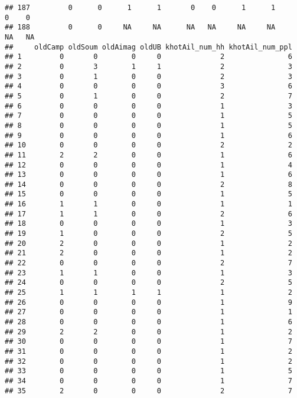 \documentclass[
]{article}
\begin{document}
\begin{verbatim}
## 187         0      0      1      1       0    0      1      1       0    0
## 188         0      0     NA     NA      NA   NA     NA     NA      NA   NA
##     oldCamp oldSoum oldAimag oldUB khotAil_num_hh khotAil_num_ppl
## 1         0       0        0     0              2               6
## 2         0       3        1     1              2               3
## 3         0       1        0     0              2               3
## 4         0       0        0     0              3               6
## 5         0       1        0     0              2               7
## 6         0       0        0     0              1               3
## 7         0       0        0     0              1               5
## 8         0       0        0     0              1               5
## 9         0       0        0     0              1               6
## 10        0       0        0     0              2               2
## 11        2       2        0     0              1               6
## 12        0       0        0     0              1               4
## 13        0       0        0     0              1               6
## 14        0       0        0     0              2               8
## 15        0       0        0     0              1               5
## 16        1       1        0     0              1               1
## 17        1       1        0     0              2               6
## 18        0       0        0     0              1               3
## 19        1       0        0     0              2               5
## 20        2       0        0     0              1               2
## 21        2       0        0     0              1               2
## 22        0       0        0     0              2               7
## 23        1       1        0     0              1               3
## 24        0       0        0     0              2               5
## 25        1       1        1     1              1               2
## 26        0       0        0     0              1               9
## 27        0       0        0     0              1               1
## 28        0       0        0     0              1               6
## 29        2       2        0     0              1               2
## 30        0       0        0     0              1               7
## 31        0       0        0     0              1               2
## 32        0       0        0     0              1               2
## 33        0       0        0     0              1               5
## 34        0       0        0     0              1               7
## 35        2       0        0     0              2               7

\end{verbatim}
\end{document}
